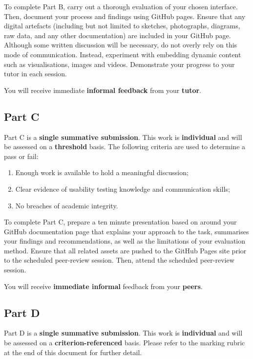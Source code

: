 \documentclass{../../fal_assignment}
\begin{document}
To complete Part B, carry out a thorough evaluation of your chosen interface. Then, document your process and findings using GitHub pages. Ensure that any digital artefacts (including but not limited to sketches, photographs, diagrams, raw data, and any other documentation) are included in your GitHub page. Although some written discussion will be necessary, do not overly rely on this mode of communication. Instead, experiment with embedding dynamic content such as visualisations, images and videos. Demonstrate your progress to your tutor in each session.

You will receive immediate \textbf{informal feedback} from your \textbf{tutor}.

\subsection*{Part C}

Part C is a \textbf{single summative submission}. This work is \textbf{individual} and will be assessed on a \textbf{threshold} basis. The following criteria are used to determine a pass or fail: 

\begin{enumerate}[label=(\alph*)]
	\item Enough work is available to hold a meaningful discussion; 
	\item Clear evidence of usability testing knowledge and communication skills; 
	\item No breaches of academic integrity. 
\end{enumerate}

To complete Part C, prepare a ten minute presentation based on around your GitHub documentation page that explains your approach to the task, summarises your findings and recommendations, as well as the limitations of your evaluation method. Ensure that all related assets are pushed to the GitHub Pages site prior to the scheduled peer-review session. Then, attend the scheduled peer-review session. 

You will receive \textbf{immediate informal} feedback from your \textbf{peers}.

\subsection*{Part D}

Part D is a \textbf{single summative submission}. This work is \textbf{individual} and will be assessed on a \textbf{criterion-referenced} basis. Please refer to the marking rubric at the end of this document for further detail.
\end{document}

